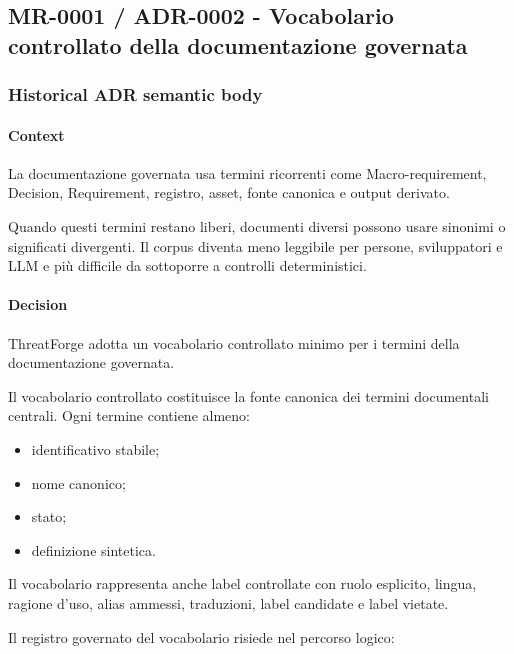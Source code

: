 \documentclass[
  10pt,
]{article}
\providecommand{\tightlist}{%
  \setlength{\itemsep}{0pt}\setlength{\parskip}{0pt}}
\begin{document}
\subsection{MR-0001 / ADR-0002 - Vocabolario controllato della
documentazione
governata}\label{mr-0001-adr-0002---vocabolario-controllato-della-documentazione-governata}

\subsubsection{Historical ADR semantic
body}\label{historical-adr-semantic-body-1}

\paragraph{Context}\label{context-2}

La documentazione governata usa termini ricorrenti come
Macro-requirement, Decision, Requirement, registro, asset, fonte
canonica e output derivato.

Quando questi termini restano liberi, documenti diversi possono usare
sinonimi o significati divergenti. Il corpus diventa meno leggibile per
persone, sviluppatori e LLM e più difficile da sottoporre a controlli
deterministici.

\paragraph{Decision}\label{decision-2}

ThreatForge adotta un vocabolario controllato minimo per i termini della
documentazione governata.

Il vocabolario controllato costituisce la fonte canonica dei termini
documentali centrali. Ogni termine contiene almeno:

\begin{itemize}
\tightlist
\item
  identificativo stabile;
\item
  nome canonico;
\item
  stato;
\item
  definizione sintetica.
\end{itemize}

Il vocabolario rappresenta anche label controllate con ruolo esplicito,
lingua, ragione d'uso, alias ammessi, traduzioni, label candidate e
label vietate.

Il registro governato del vocabolario risiede nel percorso logico:
\end{document}
